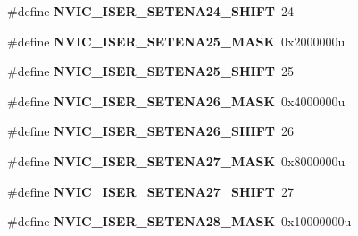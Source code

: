 \begin{DoxyCompactItemize}
\item 
\mbox{\label{group___n_v_i_c___register___masks_ga106d969fd6843d8ae2dfe751d16a3d72}} 
\#define {\bfseries N\+V\+I\+C\+\_\+\+I\+S\+E\+R\+\_\+\+S\+E\+T\+E\+N\+A24\+\_\+\+S\+H\+I\+FT}~24
\item 
\mbox{\label{group___n_v_i_c___register___masks_ga5d6ca84f80d550aa2d971d5b51d8ec27}} 
\#define {\bfseries N\+V\+I\+C\+\_\+\+I\+S\+E\+R\+\_\+\+S\+E\+T\+E\+N\+A25\+\_\+\+M\+A\+SK}~0x2000000u
\item 
\mbox{\label{group___n_v_i_c___register___masks_ga016646dc14d1f852609489fffd6f93b9}} 
\#define {\bfseries N\+V\+I\+C\+\_\+\+I\+S\+E\+R\+\_\+\+S\+E\+T\+E\+N\+A25\+\_\+\+S\+H\+I\+FT}~25
\item 
\mbox{\label{group___n_v_i_c___register___masks_ga64bbbbb044f5d81c276ebbbbee79d51f}} 
\#define {\bfseries N\+V\+I\+C\+\_\+\+I\+S\+E\+R\+\_\+\+S\+E\+T\+E\+N\+A26\+\_\+\+M\+A\+SK}~0x4000000u
\item 
\mbox{\label{group___n_v_i_c___register___masks_ga51b3ebd0bd266f814a828793c574fe4f}} 
\#define {\bfseries N\+V\+I\+C\+\_\+\+I\+S\+E\+R\+\_\+\+S\+E\+T\+E\+N\+A26\+\_\+\+S\+H\+I\+FT}~26
\item 
\mbox{\label{group___n_v_i_c___register___masks_ga415b92745cfbf6d8fd2f34c87000ae98}} 
\#define {\bfseries N\+V\+I\+C\+\_\+\+I\+S\+E\+R\+\_\+\+S\+E\+T\+E\+N\+A27\+\_\+\+M\+A\+SK}~0x8000000u
\item 
\mbox{\label{group___n_v_i_c___register___masks_ga5fbe6d73817104eef58e4e35e76b72a6}} 
\#define {\bfseries N\+V\+I\+C\+\_\+\+I\+S\+E\+R\+\_\+\+S\+E\+T\+E\+N\+A27\+\_\+\+S\+H\+I\+FT}~27
\item 
\mbox{\label{group___n_v_i_c___register___masks_ga9acc82ab89ec65c9e8b719c6eab643bf}} 
\#define {\bfseries N\+V\+I\+C\+\_\+\+I\+S\+E\+R\+\_\+\+S\+E\+T\+E\+N\+A28\+\_\+\+M\+A\+SK}~0x10000000u
\item 
\mbox{\label{group___n_v_i_c___register___masks_ga8a7ab7951dbcd9b2cf043c7df6caede0}} 

\end{DoxyCompactItemize}
